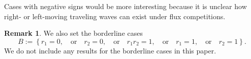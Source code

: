 \documentclass{amsart}
\theoremstyle{definition}
\newtheorem{rmk}[thm1]{Remark}
\numberwithin{equation}{section}
\begin{document}
Cases with negative signs would be more interesting because it is unclear how right- or left-moving traveling waves can exist under flux competitions. 

\begin{rmk} \label{rmk2}
 We also set the borderline cases
 \begin{equation} \label{bordercases}
B:= \left\{r_1=0, \quad \text{or} \quad r_2=0, \quad \text{or} \quad r_1r_2=1, \quad \text{or} \quad r_1=1, \quad\text{or} \quad r_2=1\right\}.
\end{equation}
We do not include any results for the borderline cases in this paper. 
\end{rmk}
\end{document}
